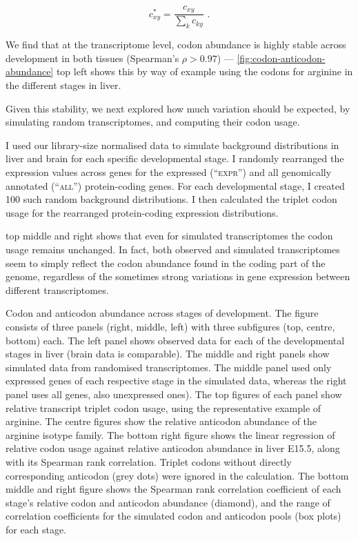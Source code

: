 \begin{equation}
    c_{xy}^* = \frac{c_{xy}}{\sum_k c_{ky}} \text{\ .}
\end{equation}

We find that at the transcriptome level, codon abundance is highly stable across
development in both tissues (Spearman’s \(\rho > 0.97\)) ---
\cref{fig:codon-anticodon-abundance} top left shows this by way of example using
the codons for arginine in the different stages in liver.

Given this stability, we next explored how much variation should be expected, by
simulating random transcriptomes, and computing their codon usage.

I used our library-size normalised \rnaseq data to simulate background
distributions in liver and brain for each specific developmental stage. I
randomly rearranged the expression values across genes for the expressed
(“\textsc{expr}”) and all genomically annotated (“\textsc{all}”) protein-coding
genes. For each developmental stage, I created \num{100} such random background
distributions. I then calculated the triplet codon usage for the rearranged
protein-coding \rna expression distributions.

 top middle and right shows that even for
simulated transcriptomes the codon usage remains unchanged. In fact, both
observed and simulated transcriptomes seem to simply reflect the codon abundance
found in the coding part of the genome, regardless of the sometimes strong
variations in gene expression between different transcriptomes.

    {Codon and anticodon abundance across stages of development.}
    {The figure consists of three panels (right, middle, left) with three
    subfigures (top, centre, bottom) each. The left panel shows observed data
    for each of the developmental stages in liver (brain data is comparable).
    The middle and right panels show simulated data from randomised
    transcriptomes. The middle panel used only expressed genes of each
    respective stage in the simulated data, whereas the right panel uses all
    genes, also unexpressed ones). The top figures of each panel show relative
    \mrna transcript triplet codon usage, using the representative example of
    arginine. The centre figures show the relative \trna anticodon abundance of
    the arginine isotype family. The bottom right figure shows the linear
    regression of relative codon usage against relative anticodon abundance in
    liver E15.5, along with its Spearman rank correlation. Triplet codons
    without directly corresponding anticodon (grey dots) were ignored in the
    calculation. The bottom middle and right figure shows the Spearman rank
    correlation coefficient of each stage’s relative codon and anticodon
    abundance (diamond), and the range of correlation coefficients for the
    simulated codon and anticodon pools (box plots) for each stage.}


